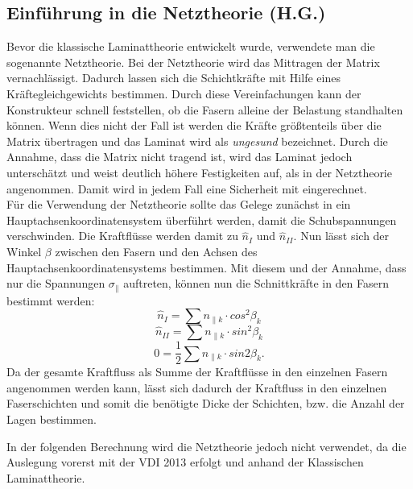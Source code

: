 \subsection{Einführung in die Netztheorie (H.G.)}
Bevor die klassische Laminattheorie entwickelt wurde, verwendete man die sogenannte Netztheorie. 
Bei der Netztheorie wird das Mittragen der Matrix vernachlässigt. Dadurch lassen sich die Schichtkräfte mit Hilfe eines Kräftegleichgewichts bestimmen. 
Durch diese Vereinfachungen kann der Konstrukteur schnell feststellen, ob die Fasern alleine der Belastung standhalten können. Wenn dies nicht der Fall ist werden die Kräfte größtenteils über die Matrix übertragen und das Laminat wird als \textit{ungesund} bezeichnet. Durch die Annahme, dass die Matrix nicht tragend ist, wird das Laminat jedoch unterschätzt und weist deutlich höhere Festigkeiten auf, als in der Netztheorie angenommen. Damit wird in jedem Fall eine Sicherheit mit eingerechnet.\\
Für die Verwendung der Netztheorie sollte das Gelege zunächst in ein Hauptachsenkoordinatensystem überführt werden, damit die Schubspannungen verschwinden. Die Kraftflüsse werden damit zu $\hat{n}_{I}$ und $\hat{n}_{II}$. Nun lässt sich der Winkel $\beta $ zwischen den Fasern und den Achsen des Hauptachsenkoordinatensystems bestimmen. Mit diesem und der Annahme, dass nur die Spannungen $\sigma_{\|}$ auftreten, können nun die Schnittkräfte in den Fasern bestimmt werden:
\begin{equation}
\hat{n}_{I}=\sum n_{\|k}\cdot cos^2\beta_{k}
\end{equation}
\begin{equation}
\hat{n}_{II}=\sum n_{\|k}\cdot sin^2\beta_{k}
\end{equation}
\begin{equation}
0=\frac{1}{2}\sum n_{\|k}\cdot sin2\beta_{k}.
\end{equation}
Da der gesamte Kraftfluss als Summe der Kraftflüsse in den einzelnen Fasern angenommen werden kann, lässt sich dadurch der Kraftfluss in den einzelnen Faserschichten und somit die benötigte Dicke der Schichten, bzw. die Anzahl der Lagen bestimmen\cite{item3}.

\noindent In der folgenden Berechnung wird die Netztheorie jedoch nicht verwendet, da die Auslegung vorerst mit der VDI 2013 erfolgt und anhand der Klassischen Laminattheorie.
\newpage
